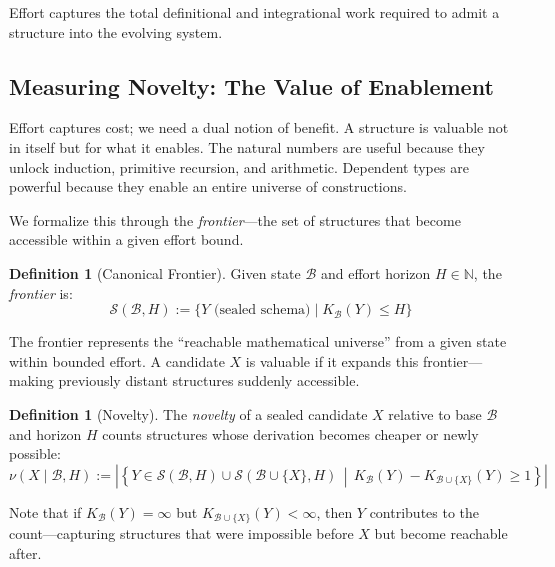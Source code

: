 \documentclass[11pt]{article}
\theoremstyle{definition}
\newtheorem{definition}[theorem]{Definition}
\theoremstyle{remark}
\newcommand{\N}{\mathbb{N}}
\begin{document}
Effort captures the total definitional and integrational work required to admit a structure into the evolving system.

\subsection{Measuring Novelty: The Value of Enablement}

Effort captures cost; we need a dual notion of benefit. A structure is valuable not in itself but for what it enables. The natural numbers are useful because they unlock induction, primitive recursion, and arithmetic. Dependent types are powerful because they enable an entire universe of constructions.

We formalize this through the \emph{frontier}---the set of structures that become accessible within a given effort bound.

\begin{definition}[Canonical Frontier]
\label{def:frontier}
Given state $\mathcal{B}$ and effort horizon $H \in \N$, the \emph{frontier} is:
\[
\mathcal{S}(\mathcal{B}, H) := \{Y \text{ (sealed schema)} \mid K_{\mathcal{B}}(Y) \leq H\}
\]
\end{definition}

The frontier represents the ``reachable mathematical universe'' from a given state within bounded effort. A candidate $X$ is valuable if it expands this frontier---making previously distant structures suddenly accessible.

\begin{definition}[Novelty]
\label{def:novelty}
The \emph{novelty} of a sealed candidate $X$ relative to base $\mathcal{B}$ and horizon $H$ counts structures whose derivation becomes cheaper or newly possible:
\[
\nu(X \mid \mathcal{B}, H) := \left|\left\{Y \in \mathcal{S}(\mathcal{B}, H) \cup \mathcal{S}(\mathcal{B} \cup \{X\}, H) \,\middle|\, K_{\mathcal{B}}(Y) - K_{\mathcal{B} \cup \{X\}}(Y) \geq 1\right\}\right|
\]
\end{definition}

Note that if $K_{\mathcal{B}}(Y) = \infty$ but $K_{\mathcal{B} \cup \{X\}}(Y) < \infty$, then $Y$ contributes to the count---capturing structures that were impossible before $X$ but become reachable after.
\end{document}
